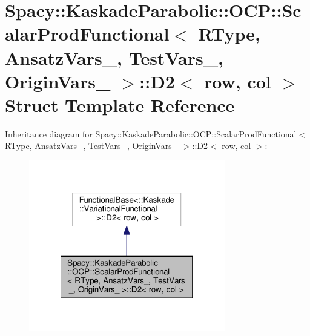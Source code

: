 \hypertarget{structSpacy_1_1KaskadeParabolic_1_1OCP_1_1ScalarProdFunctional_1_1D2}{\section{Spacy\-:\-:Kaskade\-Parabolic\-:\-:O\-C\-P\-:\-:Scalar\-Prod\-Functional$<$ R\-Type, Ansatz\-Vars\-\_\-, Test\-Vars\-\_\-, Origin\-Vars\-\_\- $>$\-:\-:D2$<$ row, col $>$ Struct Template Reference}
\label{structSpacy_1_1KaskadeParabolic_1_1OCP_1_1ScalarProdFunctional_1_1D2}
}


Inheritance diagram for Spacy\-:\-:Kaskade\-Parabolic\-:\-:O\-C\-P\-:\-:Scalar\-Prod\-Functional$<$ R\-Type, Ansatz\-Vars\-\_\-, Test\-Vars\-\_\-, Origin\-Vars\-\_\- $>$\-:\-:D2$<$ row, col $>$\-:
\nopagebreak
\begin{figure}[H]
\begin{center}
\leavevmode
\includegraphics[width=242pt]{structSpacy_1_1KaskadeParabolic_1_1OCP_1_1ScalarProdFunctional_1_1D2__inherit__graph}
\end{center}
\end{figure}


